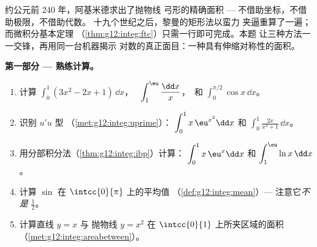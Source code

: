 \begin{problem}
\label{pb:g12:integ:1}
约公元前 240 年，阿基米德求出了抛物线
弓形的精确面积 --- 不借助坐标，不借助极限，不借助代数。
十九个世纪之后，黎曼的矩形法以蛮力
夹逼重算了一遍；而微积分基本定理
（\cref{thm:g12:integ:ftc}）只需一行即可完成。本题
让三种方法一一交锋，再用同一台机器揭示
对数的真正面目：一种具有伸缩对称性的面积。

\medskip
\noindent\textbf{第一部分 --- 熟练计算。}
\begin{enumerate}
  \item 计算 $\displaystyle\int_0^1 (3x^2 - 2x + 1)\,\dd x$，
        \ $\displaystyle\int_1^{\eu} \frac{\dd x}{x}$，\ 和
        $\displaystyle\int_0^{\pi/2} \cos x\,\dd x$。
  \item 识别 $u'u$ 型
        （\cref{met:g12:integ:uprime}）：
        $\displaystyle\int_0^1 x\,\eu^{x^2}\dd x$ 和
        $\displaystyle\int_0^1 \frac{2x}{x^2 + 1}\,\dd x$。
  \item 用分部积分法（\cref{thm:g12:integ:ibp}）计算：
        $\displaystyle\int_0^1 x\,\eu^x \dd x$ 和
        $\displaystyle\int_1^{\eu} \ln x\,\dd x$。
  \item 计算 $\sin$ 在
        $\intcc{0}{\pi}$ 上的平均值
        （\cref{def:g12:integ:mean}）--- 注意它\emph{不是}
        $\frac12$。
  \item 计算直线 $y = x$ 与
        抛物线 $y = x^2$ 在 $\intcc{0}{1}$ 上所夹区域的面积
        （\cref{met:g12:integ:areabetween}）。
\end{enumerate}


\end{problem}
